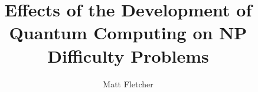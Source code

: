 \documentclass[10pt,journal,compsoc]{IEEEtran}
\begin{document}
%
\title{Effects of the Development of Quantum Computing on NP Difficulty Problems}
%
%
%
%

\author{Matt Fletcher}


% 
%
\end{document}
